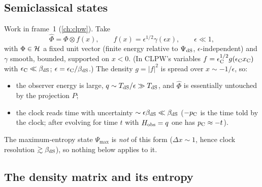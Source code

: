 \subsection{Semiclassical states}

Work in frame~1 (\cref{ch:clpw}). Take
\begin{equation}
\hat\Phi=\Phi\otimes f(x),\qquad f(x)=\epsilon^{1/2}\gamma(\epsilon x),\qquad\epsilon\ll1,\label{eq:semiclass}
\end{equation}
with $\Phi\in\mathcal{H}$ a fixed unit vector (finite energy relative to $\Psi_{\rm dS}$, $\epsilon$-independent) and $\gamma$ smooth, bounded, supported on $x<0$. (In CLPW's variables $f=\epsilon_{\rm C}^{1/2}g(\epsilon_{\rm C}x_{\rm C})$ with $\epsilon_{\rm C}\ll\beta_{\rm dS}$; $\epsilon=\epsilon_{\rm C}/\beta_{\rm dS}$.) The density $g=|f|^2$ is spread over $x\sim-1/\epsilon$, so:
\begin{itemize}
\item the observer energy is large, $q\sim T_{\rm dS}/\epsilon\gg T_{\rm dS}$, and $\hat\Phi$ is essentially untouched by the projection $P$;
\item the clock reads time with uncertainty $\sim\epsilon\beta_{\rm dS}\ll\beta_{\rm dS}$ ($-p_{\rm C}$ is the time told by the clock; after evolving for time $t$ with $H_{\rm obs}=q$ one has $p_{\rm C}\approx-t$).
\end{itemize}
The maximum-entropy state $\Psi_{\max}$ is \emph{not} of this form ($\Delta x\sim1$, hence clock resolution $\gtrsim\beta_{\rm dS}$), so nothing below applies to it.

\subsection{The density matrix and its entropy}

